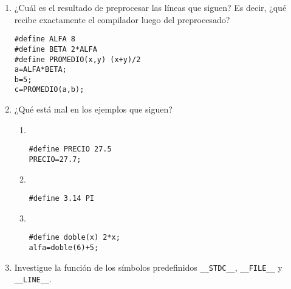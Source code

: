 \begin{enumerate}
\item  ¿Cuál es el resultado de preprocesar las líneas que siguen? Es decir, ¿qué recibe exactamente el
compilador luego del preprocesado?
\begin{lstlisting}
#define ALFA 8
#define BETA 2*ALFA
#define PROMEDIO(x,y) (x+y)/2
a=ALFA*BETA;
b=5;
c=PROMEDIO(a,b);
\end{lstlisting}
\item  ¿Qué está mal en los ejemplos que siguen?
	\begin{enumerate}[label=\alph*.]
\item  \
\begin{lstlisting}
#define PRECIO 27.5
PRECIO=27.7;
\end{lstlisting}
\item  \
\begin{lstlisting}
#define 3.14 PI
\end{lstlisting}
\item  \
\begin{lstlisting}
#define doble(x) 2*x;
alfa=doble(6)+5;
\end{lstlisting}
\end{enumerate}
\item Investigue la función de los símbolos predefinidos \texttt{\_\_STDC\_\_}, \texttt{\_\_FILE\_\_} y \texttt{\_\_LINE\_\_}.
\end{enumerate}
